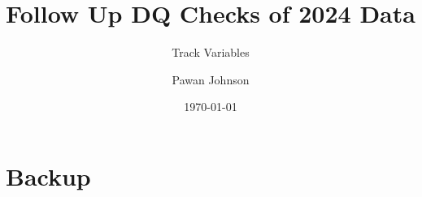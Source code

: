 \documentclass{beamer}
\title{Follow Up DQ Checks of 2024 Data}
\subtitle{Track Variables}
\author{Pawan Johnson}
\institute{University of Liverpool}
\date{\today}
\begin{document}
\begingroup
{}
\begin{frame}
    \maketitle
\end{frame}
\endgroup









\section{Backup}
\appendix
\appendsubframes
\end{document}
